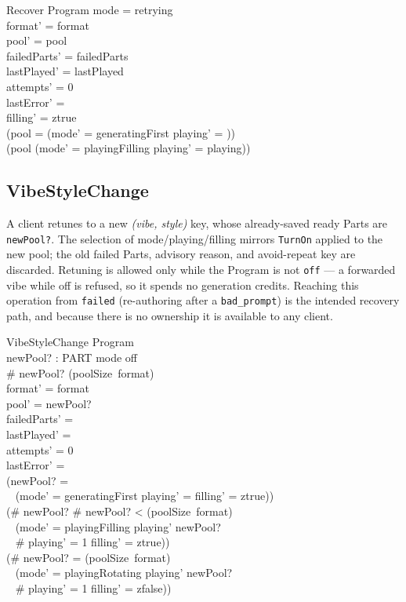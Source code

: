 \documentclass[a4paper,10pt,fleqn]{article}
\begin{document}
\begin{schema}{Recover}
  \Delta Program
  \where
  mode = retrying \\
  format' = format \\
  pool' = pool \\
  failedParts' = failedParts \\
  lastPlayed' = lastPlayed \\
  attempts' = 0 \\
  lastError' = \emptyset \\
  filling' = ztrue \\
  (pool = \emptyset \implies (mode' = generatingFirst \land playing' = \emptyset)) \\
  (pool \neq \emptyset \implies (mode' = playingFilling \land playing' = playing))
\end{schema}

\subsection{VibeStyleChange}

A client retunes to a new \emph{(vibe, style)} key, whose already-saved ready
Parts are \texttt{newPool?}. The selection of mode/playing/filling mirrors
\texttt{TurnOn} applied to the new pool; the old failed Parts, advisory reason,
and avoid-repeat key are discarded. Retuning is allowed only while
the Program is not \texttt{off} --- a forwarded vibe while off is refused, so it
spends no generation credits. Reaching this operation from \texttt{failed}
(re-authoring after a \texttt{bad\_prompt}) is the intended recovery path, and
because there is no ownership it is available to any client.

\begin{schema}{VibeStyleChange}
  \Delta Program \\
  newPool? : \power PART
  \where
  mode \neq off \\
  \# newPool? \leq (poolSize~format) \\
  format' = format \\
  pool' = newPool? \\
  failedParts' = \emptyset \\
  lastPlayed' = \emptyset \\
  attempts' = 0 \\
  lastError' = \emptyset \\
  (newPool? = \emptyset \implies \\
    \quad~ (mode' = generatingFirst \land playing' = \emptyset \land filling' = ztrue)) \\
  (\# newPool?  \land \# newPool? < (poolSize~format) \implies \\
    \quad~ (mode' = playingFilling \land playing' \subseteq newPool? \\
    \quad~ \land \# playing' = 1 \land filling' = ztrue)) \\
  (\# newPool? = (poolSize~format) \implies \\
    \quad~ (mode' = playingRotating \land playing' \subseteq newPool? \\
    \quad~ \land \# playing' = 1 \land filling' = zfalse))
\end{schema}
\end{document}
